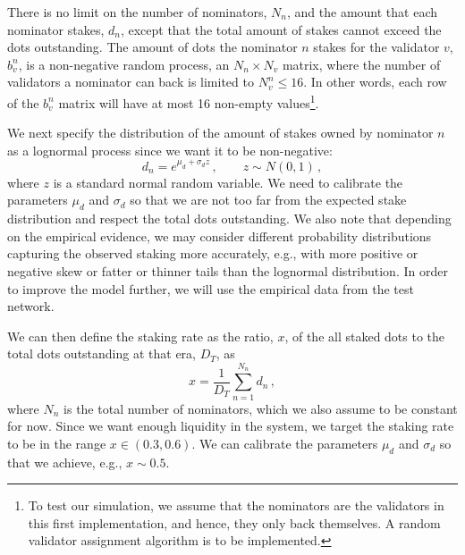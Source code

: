 \documentclass[a4,11pt]{paper}
\def\be{\begin{equation}}
\def\ee{\end{equation}}
\newcommand{\com}{\, ,}
\begin{document}
There is no limit on the number of nominators, $N_n$, and the amount that each nominator stakes, $d_n$, except that the total amount of stakes cannot exceed the dots outstanding. The amount of dots the nominator $n$ stakes for the validator $v$, $b_v^n$, is a non-negative random process, an $N_n \times N_v$ matrix,
where the number of validators a nominator can back is limited to $N_v^n \leq 16$. In other words, each row of the $b_v^n$ matrix will have at most 16 non-empty values\footnote{To test our simulation, we assume that the nominators are the validators in this first implementation, and hence, they only back themselves. A random validator assignment algorithm is to be implemented. 
}.  

We next specify the distribution of the amount of stakes owned by nominator $n$ as a lognormal process since we want it to be non-negative:
\be
d_n = e^{\mu_d + \sigma_d z} \com \qquad z \sim N(0,1) \com
\ee 
where $z$ is a standard normal random variable. We need to calibrate the parameters $\mu_d$ and $\sigma_d$ so that we are not too far from the expected stake distribution and respect the total dots outstanding. We also note that depending on the empirical evidence, we may consider different probability distributions capturing the observed staking more accurately, e.g., with more positive or negative skew or fatter or thinner tails than the lognormal distribution. In order to improve the model further, we will use the empirical data from the test network.

We can then define the staking rate as the ratio, $x$, of the all staked dots to the total dots outstanding at that era, $D_T$, as
\be \label{x}
x = \frac{1}{D_T} \sum_{n=1}^{N_n} d_n \com
\ee 
where $N_n$ is the total number of nominators, which we also assume to be constant for now. Since we want enough liquidity in the system, we target the staking rate to be in the range $x \in (0.3,0.6)$. We can calibrate the parameters $\mu_d$ and $\sigma_d$ so that we achieve, e.g., $x \sim 0.5$.  
\end{document}
